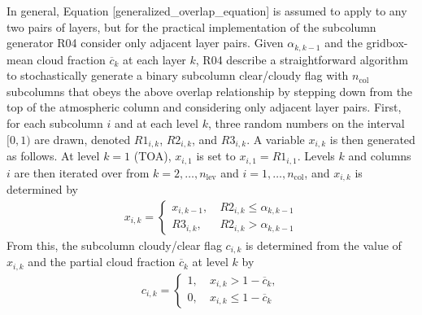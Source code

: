 In general, Equation {[}generalized\_overlap\_equation{]} is assumed to
apply to any two pairs of layers, but for the practical implementation
of the subcolumn generator R04 consider only adjacent layer pairs. Given
\(\alpha_{k, k-1}\) and the gridbox-mean cloud fraction
\(\overline{c}_{k}\) at each layer \(k\), R04 describe a straightforward
algorithm to stochastically generate a binary subcolumn clear/cloudy
flag with \(n_\textrm{col}\) subcolumns that obeys the above overlap
relationship by stepping down from the top of the atmospheric column and
considering only adjacent layer pairs. First, for each subcolumn \(i\)
and at each level \(k\), three random numbers on the interval \([0, 1)\)
are drawn, denoted \(R1_{i, k}\), \(R2_{i, k}\), and \(R3_{i, k}\). A
variable \(x_{i, k}\) is then generated as follows. At level \(k = 1\)
(TOA), \(x_{i, 1}\) is set to \(x_{i, 1} = R1_{i, 1}\). Levels \(k\) and
columns \(i\) are then iterated over from
\(k = 2, \ldots, n_\textrm{lev}\) and \(i = 1, \ldots, n_\textrm{col}\),
and \(x_{i, k}\) is determined by \[\begin{gathered}
    x_{i, k} = \begin{cases} 
        x_{i, k-1}, ~ & R2_{i, k} \le \alpha_{k, k-1} \\
        R3_{i, k}, ~ & R2_{i, k} > \alpha_{k, k-1}
    \end{cases}\end{gathered}\] From this, the subcolumn cloudy/clear
flag \(c_{i, k}\) is determined from the value of \(x_{i, k}\) and the
partial cloud fraction \(\overline{c}_{k}\) at level \(k\) by
\[\begin{gathered}
    c_{i, k} = \begin{cases}
        1, ~ & x_{i, k} > 1 - \overline{c}_{k}, \\
        0, ~ & x_{i, k} \le 1 - \overline{c}_{k}
    \end{cases}\end{gathered}\]

